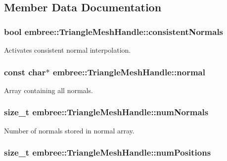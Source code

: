 \subsection{Member Data Documentation}
\hypertarget{classembree_1_1_triangle_mesh_handle_a3e42905ff0990a908bfdebdde756e002}{
\subsubsection[{consistentNormals}]{\setlength{\rightskip}{0pt plus 5cm}bool {\bf embree::TriangleMeshHandle::consistentNormals}}}
\label{classembree_1_1_triangle_mesh_handle_a3e42905ff0990a908bfdebdde756e002}


Activates consistent normal interpolation. 

\hypertarget{classembree_1_1_triangle_mesh_handle_ad4208d7cf617dbcba2a20f83ebb53ee4}{
\subsubsection[{normal}]{\setlength{\rightskip}{0pt plus 5cm}const char$\ast$ {\bf embree::TriangleMeshHandle::normal}}}
\label{classembree_1_1_triangle_mesh_handle_ad4208d7cf617dbcba2a20f83ebb53ee4}


Array containing all normals. 

\hypertarget{classembree_1_1_triangle_mesh_handle_aff1d5657fd1540c469f7b5c347b8de32}{
\subsubsection[{numNormals}]{\setlength{\rightskip}{0pt plus 5cm}size\_\-t {\bf embree::TriangleMeshHandle::numNormals}}}
\label{classembree_1_1_triangle_mesh_handle_aff1d5657fd1540c469f7b5c347b8de32}


Number of normals stored in normal array. 

\hypertarget{classembree_1_1_triangle_mesh_handle_a6349157b77e67cc255f623db20a40720}{
\subsubsection[{numPositions}]{\setlength{\rightskip}{0pt plus 5cm}size\_\-t {\bf embree::TriangleMeshHandle::numPositions}}}
\label{classembree_1_1_triangle_mesh_handle_a6349157b77e67cc255f623db20a40720}


